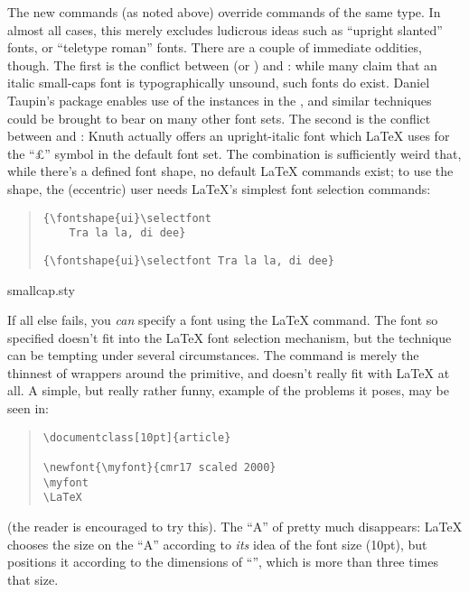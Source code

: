 The new commands (as noted above) override commands of the same type.
In almost all cases, this merely excludes ludicrous ideas such as
``upright slanted'' fonts, or ``teletype roman'' fonts.  There are a
couple of immediate oddities, though.  The first is the conflict
between  (or ) and : while many
claim that an italic small-caps font is typographically unsound, such
fonts do exist.  Daniel Taupin's  package enables
use of the instances in the , and
similar techniques could be brought to bear on many other font sets.
The second is the conflict between  and :
Knuth actually offers an upright-italic font which \LaTeX{} uses for
the ``\pounds{}'' symbol in the default font set.  The combination is
sufficiently weird that, while there's a defined font shape, no
default \LaTeX{} commands exist; to use the shape, the (eccentric) user
needs \LaTeX{}'s simplest font selection commands:
\begin{quote}
\begin{narrowversion}
\begin{verbatim}
{\fontshape{ui}\selectfont
    Tra la la, di dee}
\end{verbatim}
\end{narrowversion}
\begin{wideversion}
\begin{verbatim}
{\fontshape{ui}\selectfont Tra la la, di dee}
\end{verbatim}
\end{wideversion}
\end{quote}
\begin{ctanrefs}
\item[smallcap.sty]
\end{ctanrefs}


If all else fails, you \emph{can} specify a font using the \LaTeX{}
 command.  The font so specified doesn't fit into the
\LaTeX{} font selection mechanism, but the technique can be tempting
under several circumstances.  The command is merely the thinnest of
wrappers around the  primitive, and doesn't really fit with
\LaTeX{} at all.  A simple, but really rather funny, example of the
problems it poses, may be seen in:
\begin{quote}
\begin{verbatim}
\documentclass[10pt]{article}

\newfont{\myfont}{cmr17 scaled 2000}
\myfont
\LaTeX

\end{verbatim}
\end{quote}
(the reader is encouraged to try this).  The ``A'' of  pretty
much disappears: \LaTeX{} chooses the size on the ``A'' according to
\emph{its} idea of the font size (10pt), but positions it according to
the dimensions of ``'', which is more than three times
that size.

